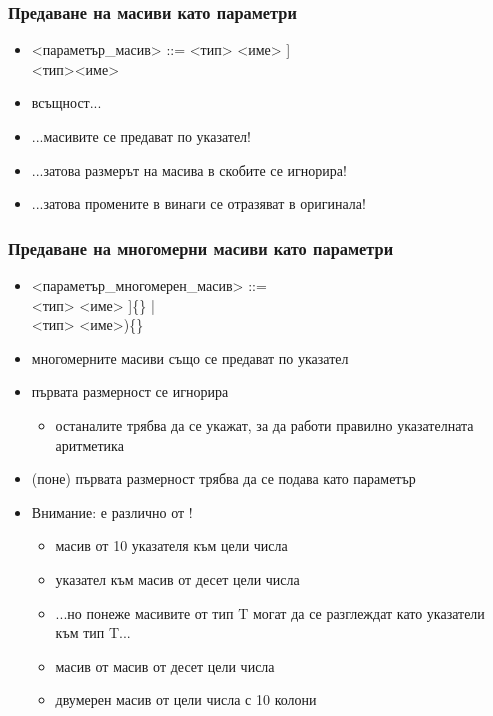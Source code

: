 \documentclass{beamer}
\begin{document}
\begin{frame}
  \frametitle{Предаване на масиви като параметри}

  \small
  \begin{itemize}[<+->]
  \item{} <параметър\_масив> ::= <тип> <име> \tta[[<константен\_израз>]\tta]\\
    \hspace{26ex}<тип>\tta* <име>
  \item всъщност...
  \item ...масивите се предават \alert{по указател}!
  \item ...затова размерът на масива в скобите се игнорира!
  \item ...затова промените в винаги се отразяват в оригинала!
  \end{itemize}
\end{frame}

\begin{frame}
  \frametitle{Предаване на многомерни масиви като параметри}

  \small
  \begin{itemize}[<+->]
  \item{} <параметър\_многомерен\_масив> ::= \\
    \hspace{10ex}<тип> <име> \tta[[<константа>]\tta]\{\} |\\
    \hspace{10ex}<тип> \tta{(*}<име>\tta)\{\}
    \item многомерните масиви също се предават по указател
    \item първата размерност се игнорира
      \begin{itemize}
      \item останалите трябва да се укажат, за да работи правилно указателната аритметика
      \end{itemize}
    \item (поне) първата размерност трябва да се подава като параметър
    \item \alert{Внимание:}  \alert{е различно от}
      !
      \begin{itemize}
      \item {} \eqv масив от 10 указателя към цели числа
      \item {} \eqv указател към масив от десет цели
        числа
      \item ...но понеже масивите от тип T могат да се разглеждат като
        указатели към тип T...
      \item {} \eqv масив от масив от десет цели числа
      \item {} \eqv двумерен масив от цели числа с 10
        колони
      \end{itemize}
  \end{itemize}
\end{frame}
\end{document}
